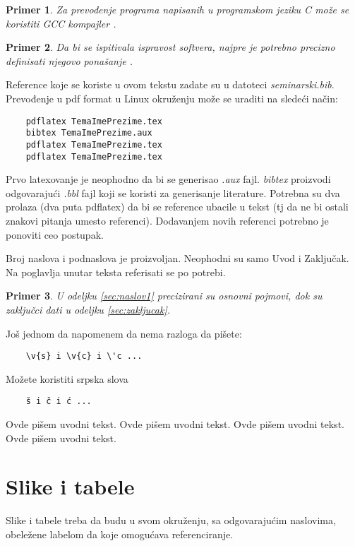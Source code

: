\documentclass[a4paper]{article}
\newtheorem{primer}{Primer}[section]
\begin{document}
	\begin{primer}
	Za prevođenje programa napisanih u programskom jeziku C može se koristiti GCC kompajler \cite{gcc}.
	\end{primer}

	\begin{primer}
	 Da bi se ispitivala ispravost softvera, najpre je potrebno precizno definisati njegovo ponašanje \cite{laski2009software}. 
	\end{primer}

	Reference koje se koriste u ovom tekstu zadate su u datoteci {\em seminarski.bib}. Prevođenje u pdf format u Linux okruženju može se uraditi na sledeći način:
	\begin{verbatim}
	pdflatex TemaImePrezime.tex 
	bibtex TemaImePrezime.aux 
	pdflatex TemaImePrezime.tex 
	pdflatex TemaImePrezime.tex 
	\end{verbatim}
	Prvo latexovanje je neophodno da bi se generisao {\em .aux} fajl. {\em bibtex} proizvodi odgovarajući {\em .bbl} fajl koji se koristi za generisanje literature. 
	Potrebna su dva prolaza (dva puta pdflatex) da bi se reference ubacile u tekst (tj da ne bi ostali znakovi pitanja umesto referenci). Dodavanjem novih referenci potrebno je ponoviti ceo postupak.  


	Broj naslova i podnaslova je proizvoljan. Neophodni su samo Uvod i Zaključak. Na poglavlja unutar teksta referisati se po potrebi. 
	\begin{primer}
	U odeljku \ref{sec:naslov1} precizirani su osnovni pojmovi, dok su zaključci dati u odeljku \ref{sec:zakljucak}.
	\end{primer}

	Još jednom da napomenem da nema razloga da pišete:
	\begin{verbatim}
	\v{s} i \v{c} i \'c ...
	\end{verbatim}
	Možete koristiti srpska slova
	\begin{verbatim}
	š i č i ć ... 
	\end{verbatim}


	Ovde pišem uvodni tekst.
	Ovde pišem uvodni tekst. 
	Ovde pišem uvodni tekst. 
	Ovde pišem uvodni tekst. 


	\section{Slike i tabele}
	\label{slike_i_tabele}

	Slike i tabele treba da budu u svom okruženju, sa odgovarajućim naslovima, obeležene labelom da koje omogućava referenciranje. 
\end{document}

